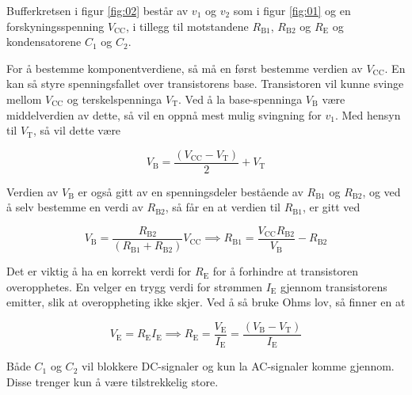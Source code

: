 Bufferkretsen i figur \ref{fig:02} består av $v_1$ og $v_2$ som i figur \ref{fig:01} og en forskyningsspenning $V_{\text{CC}}$, i tillegg til motstandene $R_{\text{B}1}$, $R_{\text{B}2}$ og $R_\text{E}$ og kondensatorene $C_1$ og $C_2$.

For å bestemme komponentverdiene, så må en først bestemme verdien av $V_{\text{CC}}$. En kan så styre spenningsfallet over transistorens base. Transistoren vil kunne svinge mellom $V_{\text{CC}}$ og terskelspenninga $V_\text{T}$. Ved å la base-spenninga $V_\text{B}$ være middelverdien av dette, så vil en oppnå mest mulig svingning for $v_1$. Med hensyn til $V_\text{T}$, så vil dette være

\begin{equation}
    V_\text{B} = \frac{(V_{\text{CC}}-V_\text{T})}{2}+V_\text{T}
\end{equation}\label{eq:V_B}

Verdien av $V_\text{B}$ er også gitt av en spenningsdeler bestående av $R_{\text{B}1}$ og $R_{\text{B}2}$, og ved å selv bestemme en verdi av $R_{\text{B}2}$, så får en at verdien til $R_{\text{B}1}$, er gitt ved

\begin{equation}
    V_\text{B} = \frac{R_{\text{B}2}}{(R_{\text{B}1}+R_{\text{B}2})}V_{\text{CC}} \implies R_{\text{B}1} = \frac{V_{\text{CC}}R_{\text{B}2}}{V_\text{B}}-R_{\text{B}2}
\end{equation}\label{eq:R_B1}

Det er viktig å ha en korrekt verdi for $R_\text{E}$ for å forhindre at transistoren overopphetes. En velger en trygg verdi for strømmen $I_\text{E}$ gjennom transistorens emitter, slik at overoppheting ikke skjer. Ved å så bruke Ohms lov, så finner en at

\begin{equation}
    V_\text{E} = R_\text{E}I_\text{E} \implies R_\text{E}=\frac{V_\text{E}}{I_\text{E}} = \frac{(V_\text{B}-V_\text{T})}{I_\text{E}}
\end{equation}\label{eq:R_E}

Både $C_1$ og $C_2$ vil blokkere DC-signaler og kun la AC-signaler komme gjennom. Disse trenger kun å være tilstrekkelig store.